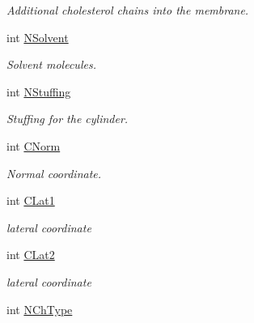 \begin{DoxyCompactItemize}
\begin{DoxyCompactList}\small\item\em Additional cholesterol chains into the membrane. \end{DoxyCompactList}\item 
int \hyperlink{classVarData_a2bc2df26f7a147d34aa971d2245eaf54}{N\+Solvent}\hypertarget{classVarData_a2bc2df26f7a147d34aa971d2245eaf54}{}\label{classVarData_a2bc2df26f7a147d34aa971d2245eaf54}

\begin{DoxyCompactList}\small\item\em Solvent molecules. \end{DoxyCompactList}\item 
int \hyperlink{classVarData_abf965a22571e95fe2a80899e567803bc}{N\+Stuffing}\hypertarget{classVarData_abf965a22571e95fe2a80899e567803bc}{}\label{classVarData_abf965a22571e95fe2a80899e567803bc}

\begin{DoxyCompactList}\small\item\em Stuffing for the cylinder. \end{DoxyCompactList}\item 
int \hyperlink{classVarData_ac5f3674d89bb344da0be11d57eea248e}{C\+Norm}\hypertarget{classVarData_ac5f3674d89bb344da0be11d57eea248e}{}\label{classVarData_ac5f3674d89bb344da0be11d57eea248e}

\begin{DoxyCompactList}\small\item\em Normal coordinate. \end{DoxyCompactList}\item 
int \hyperlink{classVarData_a08e2743fbc74ffadb73bf88a833cd03f}{C\+Lat1}\hypertarget{classVarData_a08e2743fbc74ffadb73bf88a833cd03f}{}\label{classVarData_a08e2743fbc74ffadb73bf88a833cd03f}

\begin{DoxyCompactList}\small\item\em lateral coordinate \end{DoxyCompactList}\item 
int \hyperlink{classVarData_a14ec5e9f32dac94d5974f23bbba4ff86}{C\+Lat2}\hypertarget{classVarData_a14ec5e9f32dac94d5974f23bbba4ff86}{}\label{classVarData_a14ec5e9f32dac94d5974f23bbba4ff86}

\begin{DoxyCompactList}\small\item\em lateral coordinate \end{DoxyCompactList}\item 
int \hyperlink{classVarData_ab414e7210af332040754fc1daaa67509}{N\+Ch\+Type}\hypertarget{classVarData_ab414e7210af332040754fc1daaa67509}{}\label{classVarData_ab414e7210af332040754fc1daaa67509}


\end{DoxyCompactItemize}
